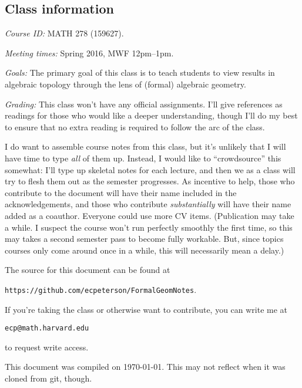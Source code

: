 
\subsection*{Class information}

\vspace{2\baselineskip} \noindent \textit{Course ID: }
MATH 278 (159627).

\vspace{\baselineskip} \noindent \textit{Meeting times: }
Spring 2016, MWF 12pm--1pm.

\vspace{\baselineskip} \noindent \textit{Goals: }
The primary goal of this class is to teach students to view results in algebraic topology through the lens of (formal) algebraic geometry.

\vspace{\baselineskip} \noindent \textit{Grading: }
This class won't have any official assignments. I'll give references as readings for those who would like a deeper understanding, though I'll do my best to ensure that no extra reading is required to follow the arc of the class.

I do want to assemble course notes from this class, but it's unlikely that I will have time to type \emph{all} of them up. Instead, I would like to ``crowdsource'' this somewhat: I'll type up skeletal notes for each lecture, and then we as a class will try to flesh them out as the semester progresses. As incentive to help, those who contribute to the document will have their name included in the acknowledgements, and those who contribute \emph{substantially} will have their name added as a coauthor. Everyone could use more CV items. (Publication may take a while. I suspect the course won't run perfectly smoothly the first time, so this may takes a second semester pass to become fully workable. But, since topics courses only come around once in a while, this will necessarily mean a delay.)

The source for this document can be found at
\begin{center}
\texttt{https://github.com/ecpeterson/FormalGeomNotes}.
\end{center}
If you're taking the class or otherwise want to contribute, you can write me at
\begin{center}
\texttt{ecp@math.harvard.edu}
\end{center}
to request write access.

This document was compiled on \today. This may not reflect when it was cloned from git, though.
